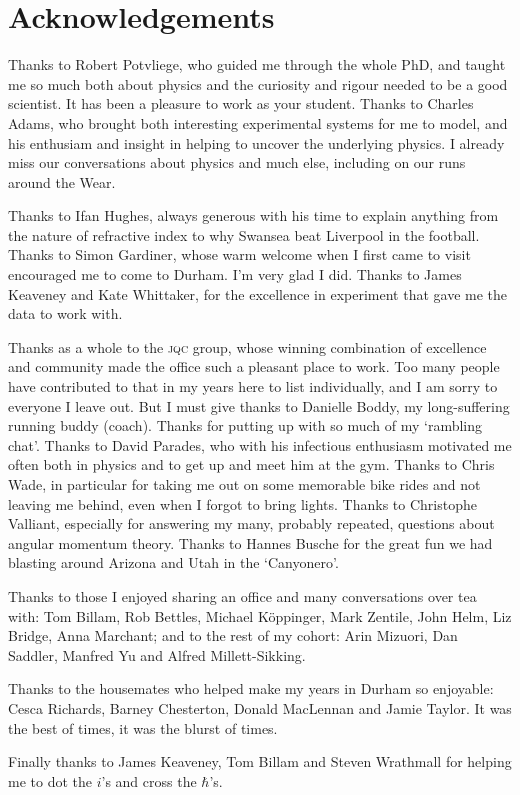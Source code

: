 \chapter*{Acknowledgements}

\begin{small} Thanks to Robert Potvliege, who guided me through the whole {PhD},
and taught me so much both about physics and the curiosity and rigour needed to
be a good scientist. It has been a pleasure to work as your student. Thanks to
Charles Adams, who brought both interesting experimental systems for me to
model, and his enthusiam and insight in helping to uncover the underlying
physics. I already miss our conversations about physics and much else, including
on our runs around the Wear.

Thanks to Ifan Hughes, always generous with his time to explain anything from
the nature of refractive index to why Swansea beat Liverpool in the football.
Thanks to Simon Gardiner, whose warm welcome when I first came to visit
encouraged me to come to Durham. I'm very glad I did. Thanks to James Keaveney
and Kate Whittaker, for the excellence in experiment that gave me the data to
work with.

Thanks as a whole to the \textsc{jqc} group, whose winning combination of
excellence and community made the office such a pleasant place to work. Too many
people have contributed to that in my years here to list individually, and I am
sorry to everyone I leave out. But I must give thanks to Danielle Boddy,
my long-suffering running buddy (\ie coach). Thanks for putting up with so much
of my `rambling chat'. Thanks to David Parades, who with his infectious
enthusiasm motivated me often both in physics and to get up and meet him at
the gym. Thanks to Chris Wade, in particular for taking me out on some memorable
bike rides and not leaving me behind, even when I forgot to bring lights. Thanks
to Christophe Valliant, especially for answering my many, probably repeated,
questions about angular momentum theory. Thanks to Hannes Busche for the
great fun we had blasting around Arizona and Utah in the `Canyonero'.

Thanks to those I enjoyed sharing an office and many conversations over tea
with: Tom Billam, Rob Bettles, Michael K\"{o}ppinger, Mark Zentile, John Helm,
Liz Bridge, Anna Marchant; and to the rest of my cohort: Arin Mizuori, Dan
Saddler, Manfred Yu and Alfred Millett-Sikking.

Thanks to the housemates who helped make my years in Durham so enjoyable: Cesca
Richards, Barney Chesterton, Donald MacLennan and Jamie Taylor. It was the best
of times, it was the blurst of times.

Finally thanks to James Keaveney, Tom Billam and Steven Wrathmall for helping me
to dot the $i$'s and cross the $\hbar$'s.
\end{small}
